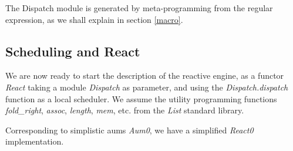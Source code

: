 The Dispatch module is generated by meta-programming from the regular 
expression, as we shall explain in section \ref{macro}.

\subsection{Scheduling and React}

We are now ready to start the description of the reactive engine, as
a functor {\sl React} taking a module {\sl Dispatch} as parameter, and using the
{\sl Dispatch.dispatch} function as a local scheduler. 
We assume the utility programming functions {\sl fold\_right},
{\sl assoc}, {\sl length}, {\sl mem}, etc. from the {\sl List}
standard library.

Corresponding to simplistic aums {\sl Aum0}, we have a simplified {\sl React0}
implementation.

